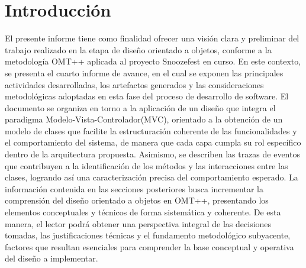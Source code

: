 \section{Introducción}
El presente informe tiene como finalidad ofrecer una visión clara y preliminar del trabajo realizado en la etapa de diseño orientado a objetos, conforme a la metodología OMT++ aplicada al proyecto Snoozefest en curso. En este contexto, se presenta el cuarto informe de avance, en el cual se exponen las principales actividades desarrolladas, los artefactos generados y las consideraciones metodológicas adoptadas en esta fase del proceso de desarrollo de software.
El documento se organiza en torno a la aplicación de un diseño que integra el paradigma Modelo-Vista-Controlador(MVC), orientado a la obtención de un modelo de clases que facilite la estructuración coherente de las funcionalidades y el comportamiento del sistema, de manera que cada capa cumpla su rol específico dentro de la arquitectura propuesta. Asimismo, se describen las trazas de eventos que contribuyen a la identificación de los métodos y las interacciones entre las clases, logrando así una caracterización precisa del comportamiento esperado.
La información contenida en las secciones posteriores busca incrementar la comprensión del diseño orientado a objetos en OMT++, presentando los elementos conceptuales y técnicos de forma sistemática y coherente. De esta manera, el lector podrá obtener una perspectiva integral de las decisiones tomadas, las justificaciones técnicas y el fundamento metodológico subyacente, factores que resultan esenciales para comprender la base conceptual y operativa del diseño a implementar.